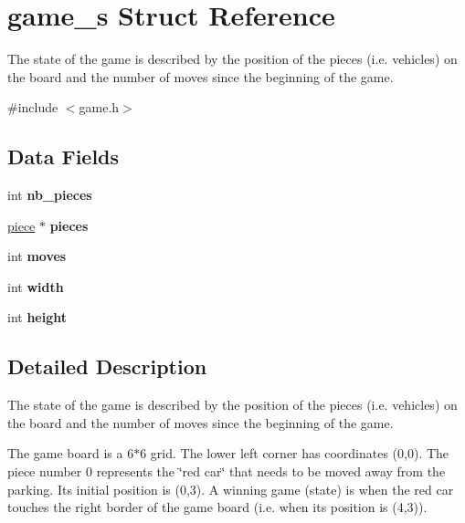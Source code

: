 \hypertarget{structgame__s}{}\section{game\+\_\+s Struct Reference}
\label{structgame__s}


The state of the game is described by the position of the pieces (i.\+e. vehicles) on the board and the number of moves since the beginning of the game.  




{\ttfamily \#include $<$game.\+h$>$}

\subsection*{Data Fields}
\begin{DoxyCompactItemize}
\item 
int {\bfseries nb\+\_\+pieces}\hypertarget{structgame__s_aa8b2314c65c18bbfb755a8241c6171c4}{}\label{structgame__s_aa8b2314c65c18bbfb755a8241c6171c4}

\item 
\hyperlink{structpiece__s}{piece} $\ast$ {\bfseries pieces}\hypertarget{structgame__s_a89abd692d28dfc7f68a3037e20846c02}{}\label{structgame__s_a89abd692d28dfc7f68a3037e20846c02}

\item 
int {\bfseries moves}\hypertarget{structgame__s_a750943ec425a1b8104d0ed4a6f4073d3}{}\label{structgame__s_a750943ec425a1b8104d0ed4a6f4073d3}

\item 
int {\bfseries width}\hypertarget{structgame__s_a2474a5474cbff19523a51eb1de01cda4}{}\label{structgame__s_a2474a5474cbff19523a51eb1de01cda4}

\item 
int {\bfseries height}\hypertarget{structgame__s_ad12fc34ce789bce6c8a05d8a17138534}{}\label{structgame__s_ad12fc34ce789bce6c8a05d8a17138534}

\end{DoxyCompactItemize}


\subsection{Detailed Description}
The state of the game is described by the position of the pieces (i.\+e. vehicles) on the board and the number of moves since the beginning of the game. 

The game board is a 6$\ast$6 grid. The lower left corner has coordinates (0,0). The piece number 0 represents the \char`\"{}red car\char`\"{} that needs to be moved away from the parking. Its initial position is (0,3). A winning game (state) is when the red car touches the right border of the game board (i.\+e. when its position is (4,3)).

